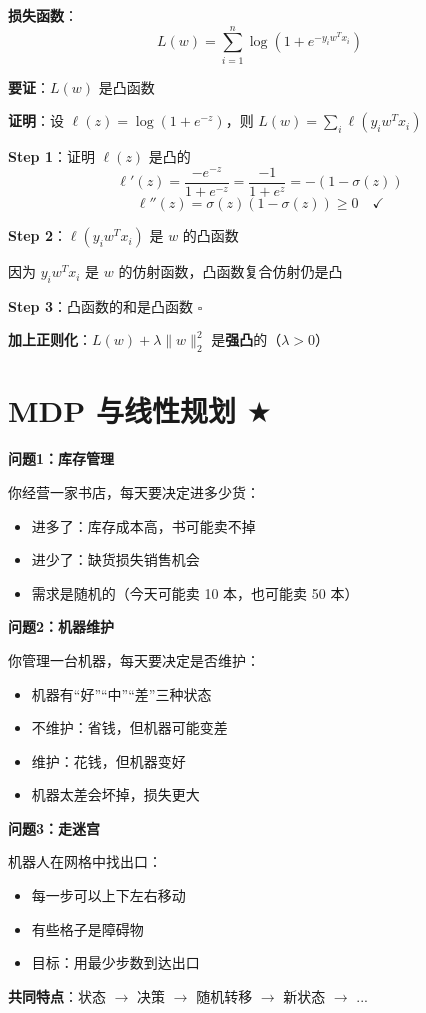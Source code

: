 \documentclass[12pt, a4paper]{ctexart}
\begin{document}
\begin{blackboard}

\textbf{损失函数}：
\[
L(w) = \sum_{i=1}^n \log(1 + e^{-y_i w^T x_i})
\]

\textbf{要证}：$L(w)$ 是凸函数

\textbf{证明}：设 $\ell(z) = \log(1 + e^{-z})$，则 $L(w) = \sum_i \ell(y_i w^T x_i)$

\textbf{Step 1}：证明 $\ell(z)$ 是凸的
\[
\ell'(z) = \frac{-e^{-z}}{1 + e^{-z}} = \frac{-1}{1 + e^z} = -(1 - \sigma(z))
\]
\[
\ell''(z) = \sigma(z)(1 - \sigma(z)) \geq 0 \quad \checkmark
\]

\textbf{Step 2}：$\ell(y_i w^T x_i)$ 是 $w$ 的凸函数

因为 $y_i w^T x_i$ 是 $w$ 的仿射函数，凸函数复合仿射仍是凸

\textbf{Step 3}：凸函数的和是凸函数 \hfill $\square$

\textbf{加上正则化}：$L(w) + \lambda \|w\|_2^2$ 是\textbf{强凸}的（$\lambda > 0$）

\end{blackboard}

\section{MDP 与线性规划 $\bigstar$}

\begin{blackboard}[从实际问题出发]

\textbf{问题1：库存管理}

你经营一家书店，每天要决定进多少货：
\begin{itemize}
    \item 进多了：库存成本高，书可能卖不掉
    \item 进少了：缺货损失销售机会
    \item 需求是随机的（今天可能卖 10 本，也可能卖 50 本）
\end{itemize}

\textbf{问题2：机器维护}

你管理一台机器，每天要决定是否维护：
\begin{itemize}
    \item 机器有``好''``中''``差''三种状态
    \item 不维护：省钱，但机器可能变差
    \item 维护：花钱，但机器变好
    \item 机器太差会坏掉，损失更大
\end{itemize}

\textbf{问题3：走迷宫}

机器人在网格中找出口：
\begin{itemize}
    \item 每一步可以上下左右移动
    \item 有些格子是障碍物
    \item 目标：用最少步数到达出口
\end{itemize}

\textbf{共同特点}：状态 $\to$ 决策 $\to$ 随机转移 $\to$ 新状态 $\to$ ...

\end{blackboard}
\end{document}
